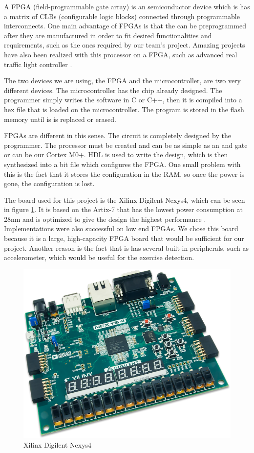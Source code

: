 
A FPGA (field-programmable gate array) is an semiconductor device which is has a matrix of CLBs (configurable logic blocks) connected through programmable interconnects. One main advantage of FPGAs is that the can be preprogrammed after they are manufactured in order to fit desired functionalities and requirements, such as the ones required by our team's project. Amazing projects have also been realized with this processor on a FPGA, such as advanced real traffic light controller \cite{traffic_light}.

The two devices we are using, the FPGA and the microcontroller, are two very different devices. The microcontroller has the chip already designed. The programmer simply writes the software in C or C++, then it is compiled into a hex file that is loaded on the microcontroller. The program is stored in the flash memory until is is replaced or erased.

FPGAs are different in this sense. The circuit is completely designed by the programmer. The processor must be created and can be as simple as an and gate or can be our Cortex M0+. HDL is used to write the design, which is then synthesized into a bit file which configures the FPGA. One small problem with this is the fact that it stores the configuration in the RAM, so once the power is gone, the configuration is lost.

The board used for this project is the Xilinx Digilent Nexys4, which can be seen in figure \ref{fig:nexys4}. It is based on the Artix-7 that has the lowest power consumption at 28nm and is optimized to give the design the highest performance \cite{cortexm0onnexys4}. Implementations were also successful on low end FPGAs. We chose this board because it is a large, high-capacity FPGA board that would be sufficient for our project. Another reason is the fact that is has several built in peripherals, such as accelerometer, which would be useful for the exercise detection. 

\begin{figure}
\centering
\includegraphics[scale=0.7]{figures/nexys4.PNG}
\caption{Xilinx Digilent Nexys4 \label{fig:nexys4}}
\end{figure}

